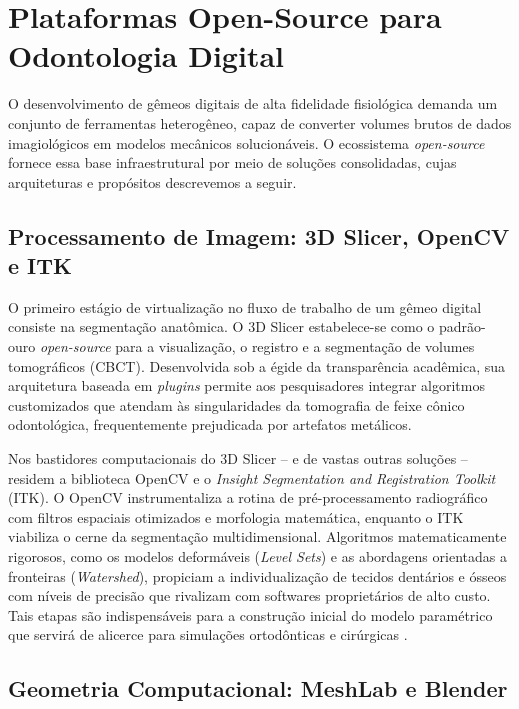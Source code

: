 \section{Plataformas Open-Source para Odontologia Digital}

O desenvolvimento de gêmeos digitais de alta fidelidade fisiológica demanda um conjunto de ferramentas heterogêneo, capaz de converter volumes brutos de dados imagiológicos em modelos mecânicos solucionáveis. O ecossistema \textit{open-source} fornece essa base infraestrutural por meio de soluções consolidadas, cujas arquiteturas e propósitos descrevemos a seguir.

\subsection{Processamento de Imagem: 3D Slicer, OpenCV e ITK}

O primeiro estágio de virtualização no fluxo de trabalho de um gêmeo digital consiste na segmentação anatômica. O 3D Slicer estabelece-se como o padrão-ouro \textit{open-source} para a visualização, o registro e a segmentação de volumes tomográficos (CBCT). Desenvolvida sob a égide da transparência acadêmica, sua arquitetura baseada em \textit{plugins} permite aos pesquisadores integrar algoritmos customizados que atendam às singularidades da tomografia de feixe cônico odontológica, frequentemente prejudicada por artefatos metálicos.

Nos bastidores computacionais do 3D Slicer -- e de vastas outras soluções -- residem a biblioteca OpenCV e o \textit{Insight Segmentation and Registration Toolkit} (ITK). O OpenCV instrumentaliza a rotina de pré-processamento radiográfico com filtros espaciais otimizados e morfologia matemática, enquanto o ITK viabiliza o cerne da segmentação multidimensional. Algoritmos matematicamente rigorosos, como os modelos deformáveis (\textit{Level Sets}) e as abordagens orientadas a fronteiras (\textit{Watershed}), propiciam a individualização de tecidos dentários e ósseos com níveis de precisão que rivalizam com softwares proprietários de alto custo. Tais etapas são indispensáveis para a construção inicial do modelo paramétrico que servirá de alicerce para simulações ortodônticas e cirúrgicas \cite{li2025impacts}.

\subsection{Geometria Computacional: MeshLab e Blender}

